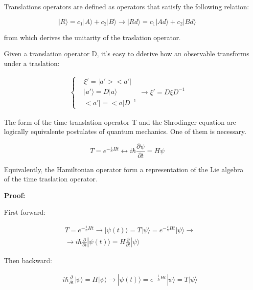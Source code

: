 \documentclass{report}
\begin{document}
Translations operators are defined as operators that satisfy the following relation:

\begin{equation}
  |R\rangle =c_1|A\rangle +c_2|B\rangle  \rightarrow |Rd\rangle =c_1|Ad\rangle +c_2|Bd\rangle
\end{equation}

from which derives the unitarity of the traslation operator.

Given a translation operator D, it's easy to dderive how an observable transforms under a traslation:

\begin{align*}
  \left\{
  \begin{aligned}
     & \xi'= |a'><a'|          \\
     & |a'\rangle = D|a\rangle \\
     & <a'|= <a|D^{-1}
  \end{aligned}
  \right.
  \rightarrow \xi'= D\xi D^{-1}
\end{align*}

The form of the time translation operator T and the Shrodinger equation are logically
equivalente postulates of quantum mechanics. One of them is necessary.

\begin{tcolorbox}[colframe=gray!50, colback=gray!10, coltitle=black, title=Time translation operator and Shrodinger equation]
  \begin{equation}
    T=e^{-\frac{i}{\hbar}Ht} \longleftrightarrow i\hbar \frac{\partial \psi}{\partial t}=H\psi
  \end{equation}
\end{tcolorbox}

Equivalently, the Hamiltonian operator form a representation of the Lie algebra of the time traslation operator.

\vspace{1cm}
\textbf{Proof:}

First forward:

\begin{align*}
   & T=e^{-\frac{i}{\hbar}Ht}\rightarrow |\psi(t)\rangle =T|\psi\rangle =e^{-\frac{i}{\hbar}Ht}|\psi\rangle \rightarrow \\
   & \rightarrow i\hbar \frac{\partial}{\partial t}|\psi(t)\rangle= H\frac{\partial}{\partial t}|\psi\rangle
\end{align*}

Then backward:

\begin{align*}
   & i\hbar \frac{\partial}{\partial t} |\psi\rangle = H |\psi\rangle \rightarrow |\psi(t)\rangle=e^{-\frac{i}{\hbar}Ht}|\psi\rangle=T|\psi\rangle
\end{align*}
\end{document}
